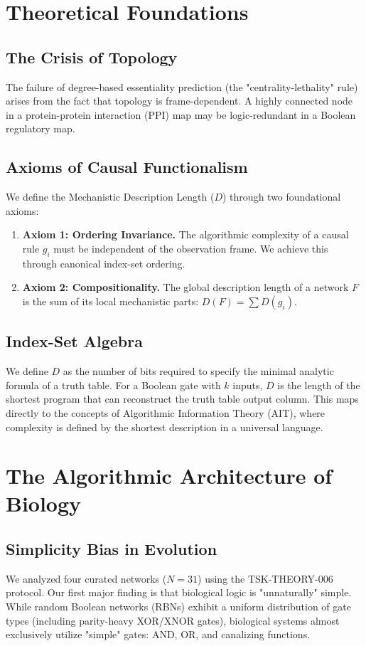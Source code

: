\documentclass[10pt,twocolumn]{article}
\begin{document}
\section{Theoretical Foundations}

\subsection{The Crisis of Topology}
The failure of degree-based essentiality prediction (the "centrality-lethality" rule) arises from the fact that topology is frame-dependent. A highly connected node in a protein-protein interaction (PPI) map may be logic-redundant in a Boolean regulatory map. 

\subsection{Axioms of Causal Functionalism}
We define the Mechanistic Description Length ($D$) through two foundational axioms:
\begin{enumerate}
    \item \textbf{Axiom 1: Ordering Invariance.} The algorithmic complexity of a causal rule $g_i$ must be independent of the observation frame. We achieve this through canonical index-set ordering.
    \item \textbf{Axiom 2: Compositionality.} The global description length of a network $F$ is the sum of its local mechanistic parts: $D(F) = \sum D(g_i)$. 
\end{enumerate}

\subsection{Index-Set Algebra}
We define $D$ as the number of bits required to specify the minimal analytic formula of a truth table. For a Boolean gate with $k$ inputs, $D$ is the length of the shortest program that can reconstruct the truth table output column. This maps directly to the concepts of Algorithmic Information Theory (AIT), where complexity is defined by the shortest description in a universal language.



\section{The Algorithmic Architecture of Biology}

\subsection{Simplicity Bias in Evolution}
We analyzed four curated networks ($N=31$) using the TSK-THEORY-006 protocol. Our first major finding is that biological logic is "unnaturally" simple. While random Boolean networks (RBNs) exhibit a uniform distribution of gate types (including parity-heavy XOR/XNOR gates), biological systems almost exclusively utilize "simple" gates: AND, OR, and canalizing functions.
\end{document}
